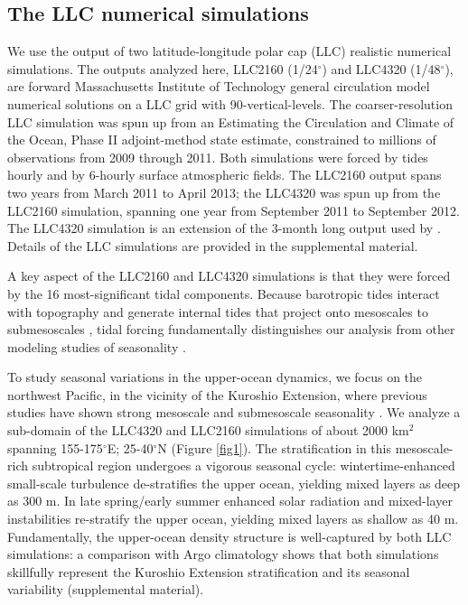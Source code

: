 \documentclass[grl]{agutex2015}
\begin{document}
\begin{article}
\section{The LLC numerical simulations}
We use the output of two latitude-longitude polar cap (LLC)
realistic numerical simulations. The outputs
analyzed here, LLC2160 (1/24$^\circ$) and LLC4320 (1/48$^\circ$),   are
forward Massachusetts Institute of Technology general circulation model \citep[MITgcm; ][]{marshall_etal1997}
numerical solutions on a LLC grid  \citep{forget_etal2015} with
90-vertical-levels. The coarser-resolution LLC simulation was
spun up from an Estimating the Circulation and Climate of the Ocean, Phase II \citep[ECCO2; ][]{menemenlis_etal2008}
adjoint-method state estimate, constrained to millions
of observations from 2009 through 2011. Both simulations were forced by
tides hourly and by 6-hourly surface atmospheric fields. The LLC2160
output spans two years from March 2011 to April 2013; the LLC4320 was spun up from
the LLC2160 simulation, spanning one year from September 2011 to September 2012.
The LLC4320 simulation is an extension of the 3-month long output used by
\citet{rocha_etal2016}.  Details of the LLC simulations are provided in the supplemental material.

A key aspect of the LLC2160 and LLC4320 simulations is that they were forced by
the 16 most-significant tidal components.
Because barotropic tides interact with topography and generate internal
tides that project onto mesoscales to submesoscales
\citep[e.g., ][]{rocha_etal2016}, tidal forcing fundamentally distinguishes our analysis
from other modeling studies of seasonality \citep{sasaki_etal2014,qiu_etal2014}.

To study seasonal variations in the upper-ocean dynamics, we focus on the northwest
Pacific, in the vicinity of the Kuroshio
Extension, where previous studies have shown strong mesoscale and submesoscale seasonality
\citep{sasaki_etal2014,qiu_etal2014}.
We analyze a sub-domain of the LLC4320 and LLC2160 simulations of about 2000 km$^2$
spanning 155-175$^\circ$E; 25-40$^\circ$N (Figure \ref{fig1}). The stratification
in this mesoscale-rich subtropical region undergoes a vigorous seasonal cycle: wintertime-enhanced
small-scale turbulence de-stratifies the upper ocean, yielding mixed layers
as deep as 300 m. In late spring/early summer enhanced solar radiation and mixed-layer
instabilities re-stratify the upper ocean, yielding mixed layers as shallow as 40 m.
Fundamentally, the upper-ocean density structure is well-captured by both LLC simulations:
a comparison with Argo climatology shows that both simulations skillfully represent the Kuroshio
Extension stratification and its seasonal variability  (supplemental material).


\end{article}
\end{document}

